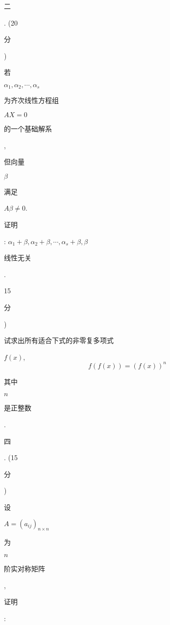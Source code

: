 \documentclass[10pt]{article}
\begin{document}
\begin{CJK}{UTF8}{mj}二\end{CJK}. (20 \begin{CJK}{UTF8}{mj}分\end{CJK}) \begin{CJK}{UTF8}{mj}若\end{CJK} $\alpha_{1}, \alpha_{2}, \cdots, \alpha_{s}$ \begin{CJK}{UTF8}{mj}为齐次线性方程组\end{CJK} $A X=0$ \begin{CJK}{UTF8}{mj}的一个基础解系\end{CJK}, \begin{CJK}{UTF8}{mj}但向量\end{CJK} $\beta$ \begin{CJK}{UTF8}{mj}满足\end{CJK} $A \beta \neq 0$. \begin{CJK}{UTF8}{mj}证明\end{CJK}: $\alpha_{1}+\beta, \alpha_{2}+\beta, \cdots, \alpha_{s}+\beta, \beta$ \begin{CJK}{UTF8}{mj}线性无关\end{CJK}.

15 \begin{CJK}{UTF8}{mj}分\end{CJK}) \begin{CJK}{UTF8}{mj}试求出所有适合下式的非零复多项式\end{CJK} $f(x)$,
$$
f(f(x))=(f(x))^{n}
$$
\begin{CJK}{UTF8}{mj}其中\end{CJK} $n$ \begin{CJK}{UTF8}{mj}是正整数\end{CJK}.

\begin{CJK}{UTF8}{mj}四\end{CJK}. (15 \begin{CJK}{UTF8}{mj}分\end{CJK}) \begin{CJK}{UTF8}{mj}设\end{CJK} $A=\left(a_{i j}\right)_{n \times n}$ \begin{CJK}{UTF8}{mj}为\end{CJK} $n$ \begin{CJK}{UTF8}{mj}阶实对称矩阵\end{CJK}, \begin{CJK}{UTF8}{mj}证明\end{CJK}:
\end{document}
